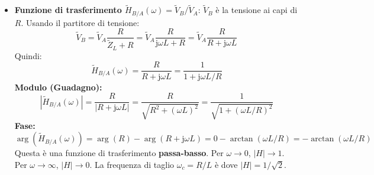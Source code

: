 \documentclass[a4paper, 11pt]{article}
\newcommand{\jj}{\mathrm{j}} %
\newcommand{\abs}[1]{\left|#1\right|}
\newcommand{\argum}[1]{\arg\left(#1\right)}
\begin{document}
\begin{itemize}
    \item \textbf{Funzione di trasferimento $\tilde{H}_{B/A}(\omega) = \tilde{V}_B / \tilde{V}_A$}:
        $\tilde{V}_B$ è la tensione ai capi di $R$. Usando il partitore di tensione:
        \begin{equation}
            \tilde{V}_B = \tilde{V}_A \frac{R}{\tilde{Z}_L + R} = \tilde{V}_A \frac{R}{\jj \omega L + R} = \tilde{V}_A \frac{R}{R + \jj \omega L}
        \end{equation}
        Quindi:
        \begin{equation} \label{eq:H_RL_VBVA}
            \tilde{H}_{B/A}(\omega) = \frac{R}{R + \jj \omega L} = \frac{1}{1 + \jj \omega L / R}
        \end{equation}
        \textbf{Modulo (Guadagno):}
        \begin{equation}
            \abs{\tilde{H}_{B/A}(\omega)} = \frac{R}{\abs{R + \jj \omega L}} = \frac{R}{\sqrt{R^2 + (\omega L)^2}} = \frac{1}{\sqrt{1 + (\omega L / R)^2}}
        \end{equation}
        \textbf{Fase:}
        \begin{equation}
            \argum{\tilde{H}_{B/A}(\omega)} = \argum{R} - \argum{R + \jj \omega L} = 0 - \arctan(\omega L / R) = -\arctan(\omega L / R)
        \end{equation}
        Questa è una funzione di trasferimento \textbf{passa-basso}. Per $\omega \to 0$, $\abs{H} \to 1$. Per $\omega \to \infty$, $\abs{H} \to 0$. La frequenza di taglio $\omega_c = R/L$ è dove $\abs{H} = 1/\sqrt{2}$.


\end{itemize}
\end{document}
